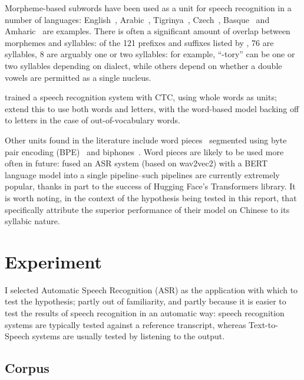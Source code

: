 \documentclass{article}[11pt]
\begin{document}
Morpheme-based subwords have been used as a unit for speech recognition in a number of languages: English~\citep{huckvale_using_2002}, Arabic~\citep{jafri_concatenative_2021}, Tigrinya~\citep{abera_tigrinya_2020}, Czech~\citep{hejtmanek_using_2010}, Basque~\citep{guijarrubia_morpheme-based_2009} and Amharic~\citep{tachbelie_morpheme-based_2010} are examples. There is often a significant amount of overlap between morphemes and syllables: of the 121 prefixes and suffixes listed by \citet{huckvale_using_2002}, 76 are syllables, 8 are arguably one or two syllables: for example, ``-tory'' can be one or two syllables depending on dialect, while others depend on whether a double vowels are permitted as a single nucleus.

\citet{soltau_neural_2017} trained a speech recognition system with CTC, using whole words as units; \citet{li_acoustic--word_2017} extend this to use both words and letters, with the word-based model backing off to letters in the case of out-of-vocabulary words. 

Other units found in the literature include word pieces~\citep{dong_cif_2020} segmented using byte pair encoding (BPE)~\citep{sennrich_neural_2016} and biphones~\citep{hadian_flat-start_2018}. Word pieces are likely to be used more often in future: \citet{yi_efficiently_2021} fused an ASR system (based on wav2vec2) with a BERT language model into a single pipeline--such pipelines are currently extremely popular, thanks in part to the success of Hugging Face's Transformers library. It is worth noting, in the context of the hypothesis being tested in this report, that \citet{dong_cif_2020} specifically attribute the superior performance of their model on Chinese to its syllabic nature.

\section{Experiment}
\label{sect:experiment}

I selected Automatic Speech Recognition (ASR) as the application with which to test the hypothesis; partly out of familiarity, and partly because it is easier to test the results of speech recognition in an automatic way: speech recognition systems are typically tested against a reference transcript, whereas Text-to-Speech systems are usually tested by listening to the output.

\subsection{Corpus}
\label{ssect:corpus}
\end{document}
